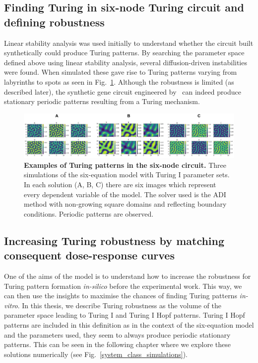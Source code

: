 \subsection{Finding Turing in six-node Turing circuit and defining robustness}
Linear stability analysis was used initially to understand whether the circuit built synthetically could produce Turing patterns.
By searching the parameter space defined above using linear stability analysis,
several diffusion-driven instabilities were found.
When simulated these gave rise to Turing patterns
varying from labyrinths to spots as seen in Fig.~\ref{fig:square_turing}.
Although the robustness is limited (as described later),
the synthetic gene circuit engineered by~\cite{Tica2020} can indeed produce stationary periodic patterns
resulting from a Turing mechanism.

\begin{figure}[H]
    \centering
    \includegraphics[width=1\textwidth]{chapters/Chapter 2/square_turing}
    \caption{\textbf{Examples of Turing patterns in the six-node circuit.} Three simulations of the six-equation model with Turing I parameter sets.
    In each solution (A, B, C) there are six images which represent every dependent variable of the model.
    The solver used is the \acrfull{ADI} method with non-growing square domains and reflecting boundary conditions.
    Periodic patterns are observed.}
    \label{fig:square_turing}
\end{figure}

\subsection{Increasing Turing robustness by matching consequent dose-response curves}\label{balancing}
One of the aims of the model is
to understand
how to increase the robustness for Turing pattern formation \textit{in-silico} before the experimental work.
This way, we can then use the insights to maximise the chances of finding Turing patterns \textit{in-vitro}.
In this thesis,
we describe Turing robustness as the volume of the parameter space leading to Turing I and Turing I Hopf patterns.
Turing I Hopf patterns are included in this definition as in the context of the six-equation model and the parameters used, they seem to always produce periodic stationary patterns.
This can be seen in the following chapter where we explore these solutions numerically (see Fig.~\ref{system_class_simulations}).

